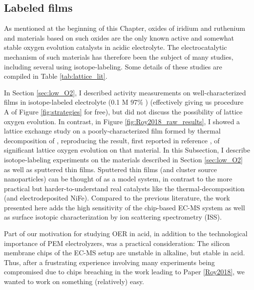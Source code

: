 \subsection{Labeled  films}

As mentioned at the beginning of this Chapter, oxides of iridium and ruthenium and materials based on such oxides are the only known active and somewhat stable oxygen evolution catalysts in acidic electrolyte\cite{Reier2017, Kibsgaard2019}. The electrocatalytic mechanism of such materials has therefore been the subject of many studies, including several using isotope-labeling\cite{WohlfahrtMeherens1987, Fierro2007, Macounova2009, Stoerzinger2017, Grimaud2017}. Some details of these studies are compiled in Table \ref{tab:lattice_lit}.

In Section \ref{sec:low_O2}, I described activity measurements on well-characterized  films in isotope-labeled electrolyte (0.1 M 97\% ) (effectively giving us procedure A of Figure \ref{fig:strategies} for free), but did not discuss the possibility of lattice oxygen evolution. In contrast, in Figure \ref{fig:Roy2018_raw_results}, I showed a lattice exchange study on a poorly-characterized  film formed by thermal decomposition of , reproducing the result, first reported in reference , of significant lattice oxygen evolution on that material. In this Subsection, I describe isotope-labeling experiments on the  materials described in Section \ref{sec:low_O2} as well as sputtered  thin films. Sputtered thin films (and cluster source nanoparticles) can be thought of as a model system, in contrast to the more practical but harder-to-understand real catalysts like the thermal-decomposition  (and electrodeposited NiFe). Compared to the previous literature, the work presented here adds the high sensitivity of the chip-based EC-MS system as well as surface isotopic characterization by ion scattering spectrometry (ISS).

Part of our motivation for studying OER in acid, in addition to the technological importance of PEM electrolyzers, was a practical consideration: The silicon membrane chips of the EC-MS setup are unstable in alkaline, but stable in acid. Thus, after a frustrating experience involving many experiments being compromised due to chips breaching in the work leading to Paper \ref{Roy2018}, we wanted to work on something (relatively) easy.

